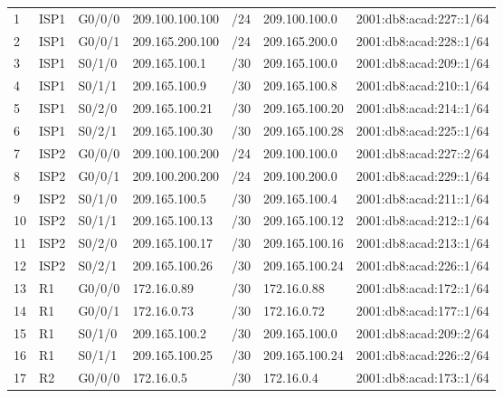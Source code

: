 \documentclass[12pt,a4paper]{report}
\begin{document}
\begin{center}
\begin{longtable}{|p{}|p{}|p{}|p{}|p{}|p{}|p{}|}
    
    \endlastfoot
        \hline  \multicolumn{7}{|c|}{I/Router biên và internet} \\
        \hline  1  &  ISP1  &  G0/0/0  &  209.100.100.100  &  /24  &  209.100.100.0  &  2001:db8:acad:227::1/64 \\
\hline  2  &  ISP1  &  G0/0/1  &  209.165.200.100  &  /24  &  209.165.200.0  &  2001:db8:acad:228::1/64 \\
\hline  3  &  ISP1  &  S0/1/0  &  209.165.100.1  &  /30  &  209.165.100.0  &  2001:db8:acad:209::1/64 \\
\hline  4  &  ISP1  &  S0/1/1  &  209.165.100.9  &  /30  &  209.165.100.8  &  2001:db8:acad:210::1/64 \\
\hline  5  &  ISP1  &  S0/2/0  &  209.165.100.21  &  /30  &  209.165.100.20  &  2001:db8:acad:214::1/64 \\
\hline  6  &  ISP1  &  S0/2/1  &  209.165.100.30  &  /30  &  209.165.100.28  &  2001:db8:acad:225::1/64 \\
\hline  7  &  ISP2  &  G0/0/0  &  209.100.100.200  &  /24  &  209.100.100.0  &  2001:db8:acad:227::2/64 \\
\hline  8  &  ISP2  &  G0/0/1  &  209.100.200.200  &  /24  &  209.100.200.0  &  2001:db8:acad:229::1/64 \\
\hline  9  &  ISP2  &  S0/1/0  &  209.165.100.5  &  /30  &  209.165.100.4  &  2001:db8:acad:211::1/64 \\
\hline  10  &  ISP2  &  S0/1/1  &  209.165.100.13  &  /30  &  209.165.100.12  &  2001:db8:acad:212::1/64 \\
\hline  11  &  ISP2  &  S0/2/0  &  209.165.100.17  &  /30  &  209.165.100.16  &  2001:db8:acad:213::1/64 \\
\hline  12  &  ISP2  &  S0/2/1  &  209.165.100.26  &  /30  &  209.165.100.24  &  2001:db8:acad:226::1/64 \\
\hline  13  &  R1  &  G0/0/0  &  172.16.0.89  &  /30  &  172.16.0.88  &  2001:db8:acad:172::1/64 \\
\hline  14  &  R1  &  G0/0/1  &  172.16.0.73  &  /30  &  172.16.0.72  &  2001:db8:acad:177::1/64 \\
\hline  15  &  R1  &  S0/1/0  &  209.165.100.2  &  /30  &  209.165.100.0  &  2001:db8:acad:209::2/64 \\
\hline  16  &  R1  &  S0/1/1  &  209.165.100.25  &  /30  &  209.165.100.24  &  2001:db8:acad:226::2/64 \\
\hline  17  &  R2  &  G0/0/0  &  172.16.0.5  &  /30  &  172.16.0.4  &  2001:db8:acad:173::1/64 \\

\end{longtable}
\end{center}
\end{document}
